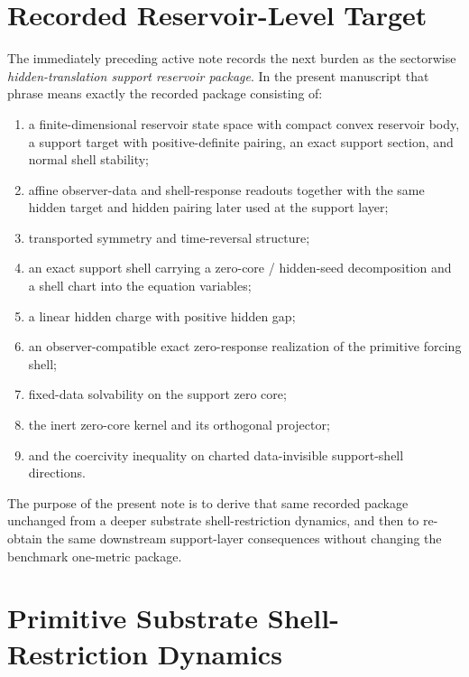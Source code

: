 \documentclass[11pt]{article}
\begin{document}
\section{Recorded Reservoir-Level Target}

The immediately preceding active note records the next burden as the sectorwise \emph{hidden-translation support reservoir package}. In the present manuscript that phrase means exactly the recorded package consisting of:
\begin{enumerate}
    \item a finite-dimensional reservoir state space with compact convex reservoir body, a support target with positive-definite pairing, an exact support section, and normal shell stability;
    \item affine observer-data and shell-response readouts together with the same hidden target and hidden pairing later used at the support layer;
    \item transported symmetry and time-reversal structure;
    \item an exact support shell carrying a zero-core / hidden-seed decomposition and a shell chart into the equation variables;
    \item a linear hidden charge with positive hidden gap;
    \item an observer-compatible exact zero-response realization of the primitive forcing shell;
    \item fixed-data solvability on the support zero core;
    \item the inert zero-core kernel and its orthogonal projector;
    \item and the coercivity inequality on charted data-invisible support-shell directions.
\end{enumerate}
The purpose of the present note is to derive that same recorded package unchanged from a deeper substrate shell-restriction dynamics, and then to re-obtain the same downstream support-layer consequences without changing the benchmark one-metric package.

\section{Primitive Substrate Shell-Restriction Dynamics}
\end{document}
